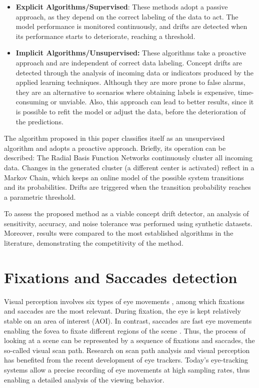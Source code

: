 \documentclass[preprint,12pt]{elsarticle}
\begin{document}
\begin{itemize}
    \item \textbf{Explicit Algorithms/Supervised}: These methods adopt a passive approach, as they depend on the correct labeling of the data to act. The model performance is monitored continuously, and drifts are detected when its performance starts to deteriorate, reaching a threshold.
    \item \textbf{Implicit Algorithms/Unsupervised:} These algorithms take a proactive approach and are independent of correct data labeling. Concept drifts are detected through the analysis of incoming data or indicators produced by the applied learning techniques. Although they are more prone to false alarms, they are an alternative to scenarios where obtaining labels is expensive, time-consuming or unviable. Also, this approach can lead to better results, since it is possible to refit the model or adjust the data, before the deterioration of the predictions.
\end{itemize}

The algorithm proposed in this paper classifies itself as an unsupervised algorithm and adopts a proactive approach.
Briefly, its operation can be described: The Radial Basis Function Networks continuously cluster all incoming data.
Changes in the generated cluster (a different center is activated) reflect in a Markov Chain, which keeps an online model of the possible system transitions and its probabilities. Drifts are triggered when the transition probability reaches a parametric threshold.

To assess the proposed method as a viable concept drift detector, an analysis of sensitivity, accuracy, and noise tolerance was performed using synthetic datasets. Moreover, results were compared to the most established algorithms in the literature, demonstrating the competitivity of the method.

\section{Fixations and Saccades detection}
\label{sec:eye_tracking}

Visual perception involves six types of eye movements \cite{leigh2015neurology}, among which fixations and saccades are the most relevant.
During fixation, the eye is kept relatively stable on an area of interest (AOI). In contrast, saccades are fast eye movements enabling the fovea to fixate different regions of the scene \cite{privitera:2005:scanpath_theory}.
Thus, the process of looking at a scene can be represented by a sequence of fixations and saccades, the so-called visual scan path.
Research on scan path analysis and visual perception has benefited from the recent development of eye trackers.
Today’s eye-tracking systems allow a precise recording of eye movements at high sampling rates, thus enabling a detailed analysis of the viewing behavior.
\end{document}
